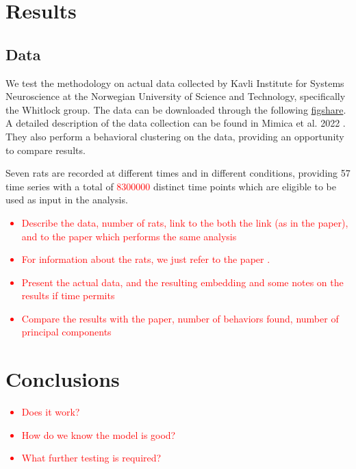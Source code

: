 \documentclass[a4paper, 10pt]{memoir}
\theoremstyle{plain}
\theoremstyle{definition}
\theoremstyle{remark}
\begin{document}
\chapter{Results}
\section{Data}
We test the methodology on actual data collected by Kavli Institute for Systems Neuroscience at the Norwegian University of Science and Technology, specifically the Whitlock group.
The data can be downloaded through the following \href{https://figshare.com/articles/dataset/Rat_3D_Tracking_E-Phys_KISN_2020_Dataset/17903834}{figshare}.
A detailed description of the data collection can be found in Mimica et al. 2022 \cite{mimica}.
They also perform a behavioral clustering on the data, providing an opportunity to compare results.

Seven rats are recorded at different times and in different conditions, providing 57 time series with a total of \textcolor{red}{8300000} distinct time points which are eligible to be used as input in the analysis.





\textcolor{red}{
\begin{itemize}
        \item Describe the data, number of rats, link to the both the link (as in the paper), and to the paper which performs the same analysis
        \item For information about the rats, we just refer to the paper \cite{mimica}.
        \item Present the actual data, and the resulting embedding and some notes on the results if time permits
        \item Compare the results with the paper, number of behaviors found, number of principal components
\end{itemize}}


\chapter{Conclusions}
\textcolor{red}{
\begin{itemize}
        \item Does it work?
        \item How do we know the model is good?
        \item What further testing is required?
\end{itemize}}



\newpage
\printbibliography
\end{document}
